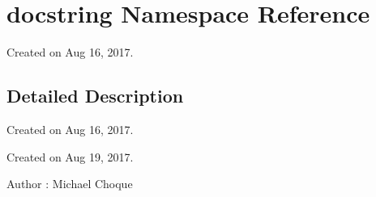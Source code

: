\hypertarget{namespacedocstring}{}\section{docstring Namespace Reference}
\label{namespacedocstring}


Created on Aug 16, 2017.  




\subsection{Detailed Description}
Created on Aug 16, 2017. 

Created on Aug 19, 2017.

\begin{DoxyAuthor}{Author}
\+: Michael Choque 
\end{DoxyAuthor}
